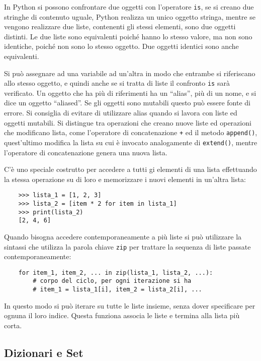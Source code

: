 \documentclass{article}
\numberwithin{equation}{subsection}
\begin{document}
In Python si possono confrontare due oggetti con l'operatore \verb|is|, se si creano due stringhe di contenuto uguale, Python realizza un unico oggetto stringa, 
mentre se vengono realizzare due liste, contenenti gli stessi elementi, sono due oggetti distinti.  
Le due liste sono equivalenti poiché hanno lo stesso valore, ma non sono identiche, poiché non sono lo stesso oggetto. Due oggetti identici sono anche equivalenti. 

Si può assegnare ad una variabile ad un'altra in modo che entrambe si riferiscano allo stesso oggetto, e quindi anche se si tratta di liste il confronto \verb|is| sarà 
verificato. Un oggetto che ha più di riferimenti ha un ``alias'', più di un nome, e si dice un oggetto ``aliased''. Se gli oggetti sono mutabili questo può essere 
fonte di errore. 
Si consiglia di evitare di utilizzare alias quando si lavora con liste ed oggetti mutabili. Si distingue tra operazioni che creano nuove liste ed operazioni che modificano 
lista, come l'operatore di concatenazione \verb|+| ed il metodo \verb|append()|, quest'ultimo modifica la lista su cui è invocato analogamente di \verb|extend()|, mentre l'operatore di 
concatenazione genera una nuova lista. 


C'è uno speciale costrutto per accedere a tutti gi elementi di una lista effettuando la stessa operazione su di loro e memorizzare i nuovi elementi in un'altra 
lista:
\begin{verbatim}
    >>> lista_1 = [1, 2, 3]
    >>> lista_2 = [item * 2 for item in lista_1]
    >>> print(lista_2)
    [2, 4, 6]
\end{verbatim}

Quando bisogna accedere contemporaneamente a più liste si può utilizzare la sintassi che utilizza la parola chiave \verb|zip| per trattare la sequenza di liste 
passate contemporaneamente:
\begin{verbatim}
    for item_1, item_2, ... in zip(lista_1, lista_2, ...):
        # corpo del ciclo, per ogni iterazione si ha
        # item_1 = lista_1[i], item_2 = lista_2[i], ...
\end{verbatim}
In questo modo si può iterare su tutte le liste insieme, senza dover specificare per ognuna il loro indice. Questa funziona associa le liste e termina alla lista più 
corta. 

\subsection{Dizionari e Set}
\end{document}
